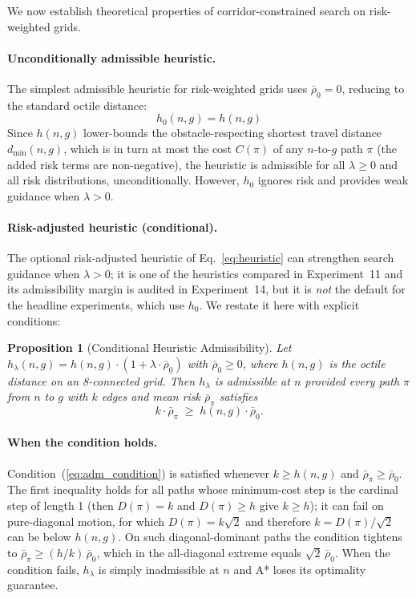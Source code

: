 \documentclass[preprint,12pt,authoryear]{elsarticle}
\newtheorem{proposition}{Proposition}
\begin{document}
We now establish theoretical properties of corridor-constrained search on risk-weighted grids.

\paragraph{Unconditionally admissible heuristic.}
The simplest admissible heuristic for risk-weighted grids uses $\bar{\rho}_0 = 0$, reducing to the standard octile distance:
\begin{equation}\label{eq:h0}
    h_0(n, g) = h(n, g)
\end{equation}
Since $h(n,g)$ lower-bounds the obstacle-respecting shortest travel distance $d_{\min}(n,g)$, which is in turn at most the cost $C(\pi)$ of any $n$-to-$g$ path $\pi$ (the added risk terms are non-negative), the heuristic is admissible for all $\lambda \geq 0$ and all risk distributions, unconditionally.
However, $h_0$ ignores risk and provides weak guidance when $\lambda > 0$.

\paragraph{Risk-adjusted heuristic (conditional).}
The optional risk-adjusted heuristic of Eq.~\eqref{eq:heuristic} can strengthen search guidance when $\lambda > 0$; it is one of the heuristics compared in Experiment~11 and its admissibility margin is audited in Experiment~14, but it is \emph{not} the default for the headline experiments, which use $h_0$. We restate it here with explicit conditions:

\begin{proposition}[Conditional Heuristic Admissibility]\label{prop:admissible}
Let $h_\lambda(n, g) = h(n, g) \cdot (1 + \lambda \cdot \bar{\rho}_0)$ with $\bar{\rho}_0 \geq 0$, where $h(n,g)$ is the octile distance on an 8-connected grid. Then $h_\lambda$ is admissible at $n$ provided every path $\pi$ from $n$ to $g$ with $k$ edges and mean risk $\bar{\rho}_\pi$ satisfies
\begin{equation}\label{eq:adm_condition}
    k \cdot \bar{\rho}_\pi \;\geq\; h(n,g) \cdot \bar{\rho}_0.
\end{equation}
\end{proposition}

\paragraph{When the condition holds.}
Condition~(\ref{eq:adm_condition}) is satisfied whenever $k \geq h(n,g)$ and $\bar{\rho}_\pi \geq \bar{\rho}_0$. The first inequality holds for all paths whose minimum-cost step is the cardinal step of length 1 (then $D(\pi) = k$ and $D(\pi) \geq h$ give $k \geq h$); it can fail on pure-diagonal motion, for which $D(\pi) = k\sqrt{2}$ and therefore $k = D(\pi)/\sqrt{2}$ can be below $h(n,g)$.
On such diagonal-dominant paths the condition tightens to $\bar{\rho}_\pi \geq (h/k)\,\bar{\rho}_0$, which in the all-diagonal extreme equals $\sqrt{2}\,\bar{\rho}_0$. When the condition fails, $h_\lambda$ is simply inadmissible at $n$ and A* loses its optimality guarantee.
\end{document}
